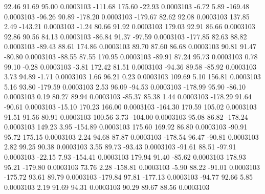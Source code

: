        92.46       91.69       95.00     0.0003103
     -111.68      175.60      -22.93     0.0003103
       -6.72        5.89     -169.48     0.0003103
      -96.26       90.89     -178.20     0.0003103
     -179.67       82.62       92.08     0.0003103
      137.85        2.49     -143.21     0.0003103
       -1.24       80.66       91.92     0.0003103
      179.03       92.91       86.66     0.0003103
       92.86       90.56       84.13     0.0003103
      -86.84       91.37      -97.59     0.0003103
     -177.85       82.63       88.82     0.0003103
      -89.43       88.61      174.86     0.0003103
       89.70       87.60       86.68     0.0003103
       90.81       91.47      -80.80     0.0003103
      -88.55       87.55      170.95     0.0003103
      -89.91       87.24       95.73     0.0003103
        0.78       99.10       -0.28     0.0003103
       -3.81      172.42       81.51     0.0003103
      -94.36       89.58      -85.92     0.0003103
        3.73       94.89       -1.71     0.0003103
        1.66       96.21        0.23     0.0003103
      109.69        5.10      156.81     0.0003103
        5.16       93.80     -179.59     0.0003103
        2.53       96.09      -94.53     0.0003103
     -178.99       95.90      -86.10     0.0003103
        0.19       80.27       89.94     0.0003103
      -85.37       85.38        1.44     0.0003103
     -178.29       91.64      -90.61     0.0003103
      -15.10      170.23      166.00     0.0003103
     -164.30      170.59      105.02     0.0003103
       91.51       91.56       80.91     0.0003103
      100.56        3.73     -104.00     0.0003103
       95.08       86.82     -178.24     0.0003103
      149.23        3.95     -154.89     0.0003103
      175.60      169.92       86.80     0.0003103
      -90.91       95.72      175.15     0.0003103
        2.24       94.68       87.87     0.0003103
     -178.54       96.47      -90.81     0.0003103
        2.82       99.25       90.38     0.0003103
        3.55       89.73      -93.43     0.0003103
      -91.61       88.51      -97.91     0.0003103
      -22.15        7.93     -154.41     0.0003103
      179.94       91.40      -85.62     0.0003103
      178.93       95.21     -179.80     0.0003103
       73.76        2.28     -158.81     0.0003103
       -5.90       88.22      -91.01     0.0003103
     -175.72       93.61       89.79     0.0003103
     -179.84       97.81     -177.13     0.0003103
      -94.77       92.66        5.85     0.0003103
        2.19       91.69       94.31     0.0003103
       90.29       89.67       88.56     0.0003103
